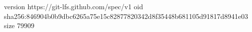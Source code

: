 version https://git-lfs.github.com/spec/v1
oid sha256:846904b0b9dbc6265a75e15c82877820342d8f35448b681105d91817d8941e03
size 79909
